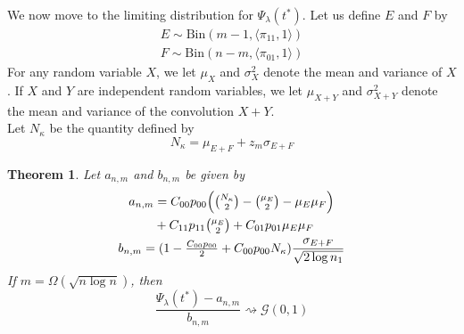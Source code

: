 \documentclass[draftcls]{IEEEtran}
\newtheorem{theorem}{Theorem}
\theoremstyle{definition}
\begin{document}
We now move to the limiting distribution for $\Psi_{\lambda}(t^{*})$. 
Let us define $E$ and $F$ by
\begin{gather*}
  E \sim \mathrm{Bin}(m-1, \langle \pi_{11}, 1 \rangle) \\ F \sim \mathrm{Bin}(n-m,
  \langle \pi_{01}, 1 \rangle)
\end{gather*}%
For any random variable $X$, we let $\mu_X$ and $\sigma_X^{2}$ denote
the mean and variance of $X$. If $X$ and $Y$ are independent random
variables, we let $\mu_{X + Y}$ and $\sigma_{X + Y}^2$ denote the mean
and variance of the convolution $X + Y$. \\
\noindent Let $N_{\kappa}$ be the quantity defined by
\begin{equation}
  \label{eq:18}
  N_{\kappa} = \mu_{E + F} + z_m \sigma_{E + F}
\end{equation}
\begin{theorem}
  \label{thm:3}
  Let $a_{n,m}$ and $b_{n,m}$ be given by
  \begin{gather}
    \label{eq:28}
    \begin{split}
    a_{n,m} &=%
    C_{00} p_{00} \Bigl(\tbinom{N_\kappa}{2} - \tbinom{\mu_E}{2} - \mu_E
    \mu_F\Bigr) \\ 
     & + C_{11} p_{11} \tbinom{\mu_E}{2} + C_{01} p_{01} \mu_E \mu_F 
    \end{split} \\
    b_{n,m} = (1 - \tfrac{C_{00} p_{00}}{2} + C_{00} p_{00}
    N_\kappa)\frac{\sigma_{E + F}}{\sqrt{2 \log{n_1}}}
  \end{gather}
  If $m = \Omega(\sqrt{n \log n})$, then
  \begin{equation}
    \label{eq:29}
    \frac{\Psi_{\lambda}(t^{*}) - a_{n,m}}{b_{n,m}}  \rightsquigarrow \mathcal{G}(0,1)  \end{equation}
\end{theorem}
\appendices
\end{document}
